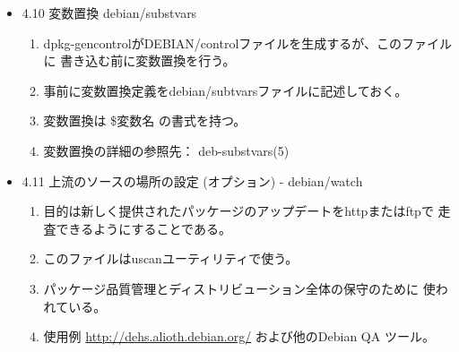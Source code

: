 \documentclass[mingoth,a4paper]{jsarticle}
\begin{document}
\begin{itemize}
\begin{enumerate}
    (dpkg-buildpackageで呼び出されるターゲット)
    \begin{itemize}
    \item clean: ソースツリーのクリーン
    \item binary: ソースパッケージのビルド
    \item binary-arch: アーキテクチャ依存のバイナリパッケージをビルド
    \item binary-indep: オートビルダ\footnote{種々の移植版をサポート}システム使用時は不要。
    \item build: ビルド(コンパイル)を行いバイナリパッケージを構築する。
    \end{itemize}
    (詳細は割愛)
  \end{enumerate}

\item 4.10 変数置換 debian/substvars
  \begin{enumerate}
  \item  dpkg-gencontrolがDEBIAN/controlファイルを生成するが、このファイルに
    書き込む前に変数置換を行う。
  \item  事前に変数置換定義をdebian/subtvarsファイルに記述しておく。
  \item  変数置換は \${変数名} の書式を持つ。
  \item  変数置換の詳細の参照先： deb-substvars(5)
  \end{enumerate}

\item 4.11 上流のソースの場所の設定 (オプション) - debian/watch
  \begin{enumerate}
  \item 目的は新しく提供されたパッケージのアップデートをhttpまたはftpで
    走査できるようにすることである。
  \item このファイルはuscanユーティリティで使う。
  \item パッケージ品質管理とディストリビューション全体の保守のために
    使われている。
  \item 使用例
    \url{http://dehs.alioth.debian.org/} および他のDebian QA ツール。
  \end{enumerate}


\end{itemize}
\end{document}
